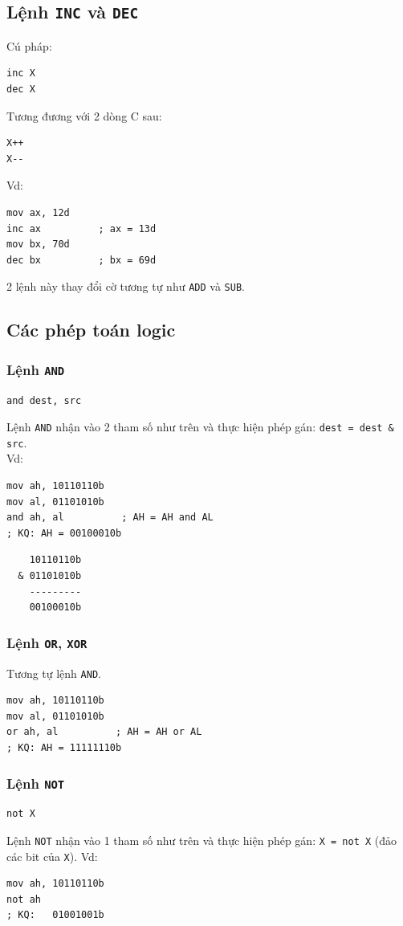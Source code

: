 \documentclass[12pt]{report}
\newcommand{\code}[1]{\texttt{#1}}
\begin{document}
\subsection{Lệnh \code{INC} và \code{DEC}}
Cú pháp:
\begin{verbatim}
inc X
dec X
\end{verbatim}
Tương đương với 2 dòng C sau:
\begin{verbatim}
X++
X--
\end{verbatim}
Vd:
\begin{verbatim}
mov ax, 12d 
inc ax          ; ax = 13d
mov bx, 70d     
dec bx          ; bx = 69d
\end{verbatim}
2 lệnh này thay đổi cờ tương tự như \code{ADD} và \code{SUB}.

\subsection{Các phép toán logic}
\subsubsection{Lệnh \code{AND}}
\begin{verbatim}
and dest, src
\end{verbatim}
Lệnh \code{AND} nhận vào 2 tham số như trên và thực hiện phép gán: \code{dest = dest \& src}.\\
Vd:
\begin{verbatim}
mov ah, 10110110b
mov al, 01101010b
and ah, al          ; AH = AH and AL 
; KQ: AH = 00100010b
\end{verbatim}
\begin{verbatim}
    10110110b
  & 01101010b
    ---------
    00100010b
\end{verbatim}

\subsubsection{Lệnh \code{OR}, \code{XOR}}
Tương tự lệnh \code{AND}.
\begin{verbatim}
mov ah, 10110110b
mov al, 01101010b
or ah, al          ; AH = AH or AL 
; KQ: AH = 11111110b
\end{verbatim}

\subsubsection{Lệnh \code{NOT}}
\begin{verbatim}
not X
\end{verbatim}
Lệnh \code{NOT} nhận vào 1 tham số như trên và thực hiện phép gán: \code{X = not X} (đảo các bit của \code X).
Vd:
\begin{verbatim}
mov ah, 10110110b
not ah
; KQ:   01001001b
\end{verbatim}
\end{document}
